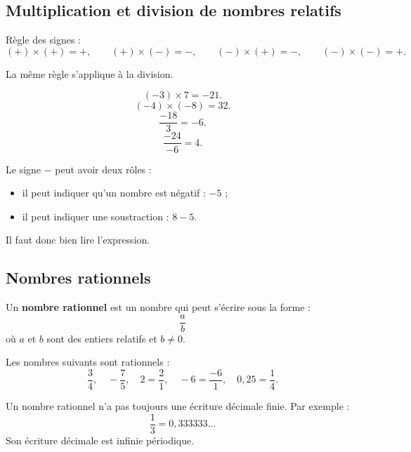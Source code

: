 \documentclass[11pt,a4paper]{article}
\begin{document}
\subsection{Multiplication et division de nombres relatifs}

\begin{propriete}
Règle des signes :
\[
(+)\times(+)=+,
\qquad
(+)\times(-)=-,
\qquad
(-)\times(+)=-,
\qquad
(-)\times(-)=+.
\]

La même règle s'applique à la division.
\end{propriete}

\begin{exemple}
\[
(-3)\times 7=-21.
\]
\[
(-4)\times(-8)=32.
\]
\[
\frac{-18}{3}=-6.
\]
\[
\frac{-24}{-6}=4.
\]
\end{exemple}

\begin{attention}
Le signe $-$ peut avoir deux rôles :
\begin{itemize}
  \item il peut indiquer qu'un nombre est négatif : $-5$ ;
  \item il peut indiquer une soustraction : $8-5$.
\end{itemize}
Il faut donc bien lire l'expression.
\end{attention}

\subsection{Nombres rationnels}

\begin{definitionbox}
Un \textbf{nombre rationnel} est un nombre qui peut s'écrire sous la forme :
\[
\frac{a}{b}
\]
où $a$ et $b$ sont des entiers relatifs et $b\neq 0$.
\end{definitionbox}

\begin{exemple}
Les nombres suivants sont rationnels :
\[
\frac{3}{4},\quad -\frac{7}{5},\quad 2=\frac{2}{1},\quad -6=\frac{-6}{1},\quad 0{,}25=\frac{1}{4}.
\]
\end{exemple}

\begin{attention}
Un nombre rationnel n'a pas toujours une écriture décimale finie. Par exemple :
\[
\frac{1}{3}=0{,}333333\ldots
\]
Son écriture décimale est infinie périodique.
\end{attention}
\end{document}
